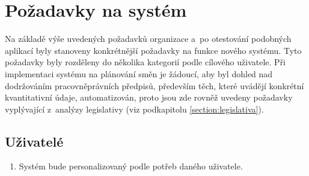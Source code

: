 \documentclass[twoside]{ctuthesis}
\begin{document}
%

\section{Požadavky na systém}
Na základě výše uvedených požadavků organizace a~po otestování podobných aplikací byly stanoveny konkrétnější požadavky na funkce nového systému. Tyto požadavky byly rozděleny do několika kategorií podle cílového uživatele. Při implementaci systému na plánování směn je žádoucí, aby byl dohled nad dodržováním pracovněprávních předpisů, především těch, které uvádějí konkrétní kvantitativní údaje, automatizován, proto jsou zde rovněž uvedeny požadavky vyplývající z~analýzy legislativy (viz podkapitolu \ref{section:legislativa}).

\subsection{Uživatelé}
\begin{enumerate}[label=\textbf{U\arabic*.}]
		\item Systém bude personalizovaný podle potřeb daného uživatele.
\end{enumerate}
\end{document}
